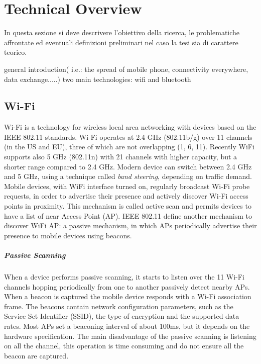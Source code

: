 \chapter{Technical Overview}
\label{chapter 3}
\thispagestyle{empty}


\noindent In questa sezione si deve descrivere l'obiettivo della ricerca, le problematiche affrontate ed eventuali definizioni preliminari nel caso la tesi sia di carattere teorico.

general introduction( i.e.: the spread of mobile phone, connectivity everywhere, data exchange.....)
two main technologies: wifi and bluetooth


\section{Wi-Fi}
Wi-Fi is a technology for wireless local area networking with devices based on the IEEE 802.11 standards. Wi-Fi operates at 2.4 GHz (802.11b/g) over 11 channels (in the US and EU), three of which are not overlapping (1, 6, 11). Recently WiFi supports also 5 GHz (802.11n) with 21 channels with higher capacity, but a shorter range compared to 2.4 GHz. Modern device can switch between 2.4 GHz and 5 GHz, using a technique called \textit{band steering}, depending on traffic demand.\\
\linebreak
Mobile devices, with WiFi interface turned on, regularly broadcast Wi-Fi probe requests, in order to advertise their presence and actively discover Wi-Fi access points in proximity. This mechanism is called active scan and permits devices to have a list of near Access Point (AP). IEEE 802.11 define another mechanism to discover WiFi AP: a passive mechanism, in which APs periodically advertise their presence to mobile devices using beacons.
\paragraph{Passive Scanning}
When a device performs passive scanning, it starts to listen over the 11 Wi-Fi channels hopping periodically from one to another passively detect nearby APs. When a beacon is captured the mobile device responds with a Wi-Fi association frame. The beacons contain network configuration parameters, such as the Service Set Identifier (SSID), the type of encryption and the supported data rates. Most APs set a beaconing interval of about 100ms, but it depends on the hardware specification.
The main disadvantage of the passive scanning is listening on all the channel, this operation is time consuming and do not ensure all the beacon are captured.
